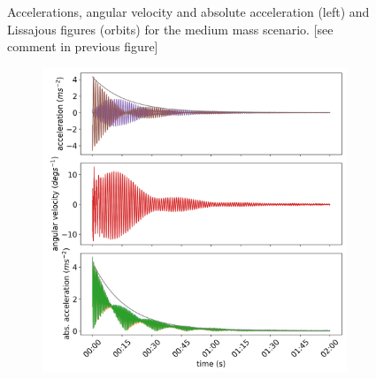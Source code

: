 \documentclass{article}
\begin{document}
\begin{figure}
\begin{subfigure}[b]{0.45\textwidth}
        \caption{}
        \label{fig:medium-mass:orbit}
    \end{subfigure}
    
    \caption{Accelerations, angular velocity and absolute acceleration (left) and Lissajous figures (orbits) for the medium mass scenario. [see comment in previous figure]}
    \label{fig:medium-mass}
\end{figure}


\begin{figure}

    \centering
    \begin{subfigure}[b]{0.45\textwidth}
        \centering
        \includegraphics[width=\textwidth]{../results/experiment/high_mass_acceleration.png}
        \caption{}
        \label{fig:high-mass:acc}
    \end{subfigure}
    \begin{subfigure}[b]{0.45\textwidth}
        \centering

\end{subfigure}
\end{figure}
\end{document}
